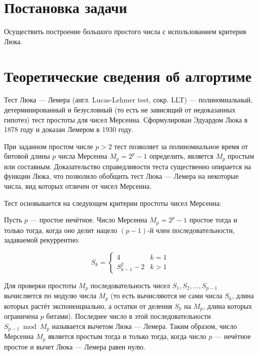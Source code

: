 \documentclass[spec, och, labwork]{shiza}
\begin{document}
\tableofcontents

\section{Постановка задачи}

Осуществить построение большого простого числа с использованием критерия Люка.

\section{Теоретические сведения об алгортиме}

Тест Люка — Лемера (англ. Lucas-Lehmer test, сокр. LLT) — полиномиальный, 
детерминированный и безусловный (то есть не зависящий от недоказанных 
гипотез) тест простоты для чисел Мерсенна. Сформулирован Эдуардом Люка в 
1878 году и доказан Лемером в 1930 году.

При заданном простом числе $p>2$ тест позволяет за полиномиальное время 
от битовой длины $p$ числа Мерсенна $M_{p}=2^{p}-1$ определить, является 
$M_{p}$ простым или составным. Доказательство справедливости теста 
существенно опирается на функции Люка, что позволило обобщить тест Люка 
— Лемера на некоторые числа, вид которых отличен от чисел Мерсенна.

Тест основывается на следующем критерии простоты чисел Мерсенна:

Пусть $p$ — простое нечётное. Число Мерсенна $M_{p}=2^{p}-1$ простое 
тогда и только тогда, когда оно делит нацело $(p-1)$-й член 
последовательности, задаваемой рекуррентно:

\begin{equation*}
    S_k = 
    \begin{cases}
        4 &\text {$k = 1$} \\
        S_{k-1}^2 - 2 &\text {$k > 1$}
    \end{cases}
\end{equation*}

Для проверки простоты $M_{p}$ последовательность чисел $S_{1},S_{2},
\ldots ,S_{p-1}$ вычисляется по модулю числа $M_{p}$ (то есть вычисляются 
не сами числа $S_k$, длина которых растёт экспоненциально, а остатки от 
деления $S_k$ на $M_{p}$, длина которых ограничена $p$ битами). Последнее 
число в этой последовательности $S_{p-1}{\bmod {M}}_{p}$ называется 
вычетом Люка — Лемера. Таким образом, число Мерсенна $M_{p}$ является 
простым тогда и только тогда, когда число $p$ — нечётное простое и вычет 
Люка — Лемера равен нулю.
\end{document}
